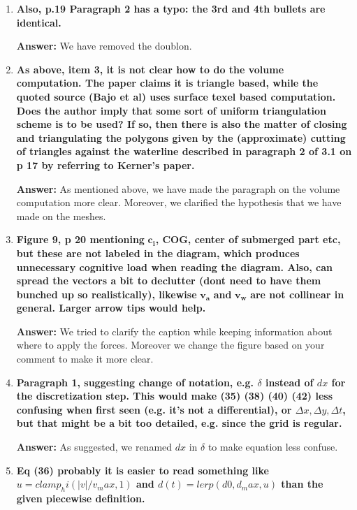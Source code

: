 \documentclass{article}
\newcommand{\answer}[1]{\textbf{\textcolor{answercolor}{Answer:}} \textcolor{answercolor}{#1}}
\begin{document}
\begin{enumerate}[label=\textbf{\arabic*.}]
    \answer{We have merge the two sections to remove redundancy.}

    \item \textbf{Also, p.19 Paragraph 2 has a typo: the 3rd and 4th bullets are identical.}
    
    \answer{We have removed the doublon.}

    \item \textbf{As above, item 3, it is not clear how to do the volume computation. The paper claims it is triangle based, while the quoted source (Bajo et al) uses surface texel based computation. Does the author imply that some sort of uniform triangulation scheme is to be used? If so, then there is also the matter of closing and triangulating the polygons given by the (approximate) cutting of triangles against the waterline described in paragraph 2 of 3.1 on p 17 by referring to Kerner's paper.}
    
    \answer{As mentioned above, we have made the paragraph on the volume computation more clear. Moreover, we clarified the hypothesis that we have made on the meshes.}


    \item \textbf{Figure 9, p 20 mentioning }$\mathbf{c_i}$\textbf{, COG, center of submerged part etc, but these are not labeled in the diagram, which produces unnecessary cognitive load when reading the diagram. Also, can spread the vectors a bit to declutter (dont need to have them bunched up so realistically), likewise }$\mathbf{v_a}$\textbf{ and }$\mathbf{v_w}$\textbf{ are not collinear in general. Larger arrow tips would help.}
    
    \answer{We tried to clarify the caption while keeping information about where to apply the forces. Moreover we change the figure based on your comment to make it more clear.}

    
    \item \textbf{ Paragraph 1, suggesting change of notation, e.g. $\delta$ instead of $dx$ for the discretization step. This would make (35) (38) (40) (42) less confusing when first seen (e.g. it's not a differential), or $\Delta{x}, \Delta{y}, \Delta{t}$, but that might be a bit too detailed, e.g. since the grid is regular.}
    
    \answer{As suggested, we renamed $dx$ in $\delta$ to make equation less confuse.}

    \item \textbf{Eq (36)  probably it is easier to read something like $u = clamp_hi(|v|/v_max, 1)$ and $d(t) = lerp(d0, d_max, u)$ than the given piecewise definition.}
    

\end{enumerate}
\end{document}
